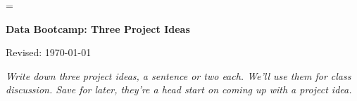 \documentclass[11pt]{article}
\begin{document}
\parskip=\bigskipamount
\parindent=0.0in
\thispagestyle{empty}


\bigskip\bigskip
\centerline{\Large \bf Data Bootcamp: Three Project Ideas}
\centerline{Revised: \today}

\medskip
{\it Write down three project ideas, a sentence or two each. We'll use them for class discussion.
Save for later, they're a head start on coming up with a project idea.}



\end{document}
